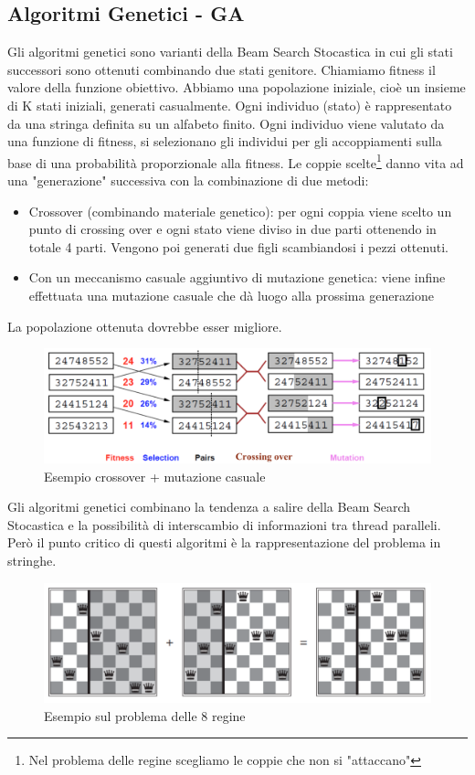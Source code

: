 \documentclass{article}
\begin{document}
\subsection{Algoritmi Genetici - GA}
Gli algoritmi genetici sono varianti della Beam Search Stocastica in cui gli stati successori sono ottenuti combinando due stati genitore. Chiamiamo fitness il valore della funzione obiettivo. \newline
Abbiamo una popolazione iniziale, cioè un insieme di K stati iniziali, generati casualmente. Ogni individuo (stato) è rappresentato da una stringa definita su un alfabeto finito. Ogni individuo viene valutato da una funzione di fitness, si selezionano gli individui per gli accoppiamenti sulla base di una probabilità proporzionale alla fitness. Le coppie scelte\footnote{Nel problema delle regine scegliamo le coppie che non si "attaccano"} danno vita ad una "generazione" successiva con la combinazione di due metodi:
\begin{itemize}
    \item Crossover (combinando materiale genetico): per ogni coppia viene scelto un punto di crossing over e ogni stato viene diviso in due parti ottenendo in totale 4 parti. Vengono poi generati due figli scambiandosi i pezzi ottenuti.
    \item Con un meccanismo casuale aggiuntivo di mutazione genetica: viene infine effettuata una mutazione casuale che dà luogo alla prossima generazione
\end{itemize}
La popolazione ottenuta dovrebbe esser migliore.
\begin{figure}[H]
    \centering
    \includegraphics[scale=0.5]{Images/alggeneticicross.png}
    \caption{Esempio crossover + mutazione casuale}
\end{figure}
Gli algoritmi genetici combinano la tendenza a salire della Beam Search Stocastica e la possibilità di interscambio di informazioni tra thread paralleli. Però il punto critico di questi algoritmi è la rappresentazione del problema in stringhe.
\begin{figure}[H]
    \centering
    \includegraphics[scale=0.5]{Images/alggenscacchi.png}
    \caption{Esempio sul problema delle 8 regine}
\end{figure}
\end{document}
